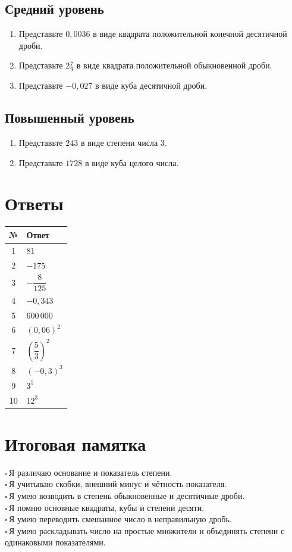 \documentclass[a4paper,12pt]{article}
\newcommand{\cb}{\(\square\)\,}
\begin{document}
\subsection*{Средний уровень}
\begin{enumerate}[leftmargin=*,start=6,itemsep=9pt]
\item Представьте $0,0036$ в виде квадрата положительной конечной десятичной дроби.
\item Представьте $\displaystyle 2\frac79$ в виде квадрата положительной обыкновенной дроби.
\item Представьте $-0,027$ в виде куба десятичной дроби.
\end{enumerate}
\subsection*{Повышенный уровень}
\begin{enumerate}[leftmargin=*,start=9,itemsep=9pt]
\item Представьте $243$ в виде степени числа $3$.
\item Представьте $1728$ в виде куба целого числа.
\end{enumerate}
\clearpage
\section*{Ответы}
\begin{center}
\renewcommand{\arraystretch}{1.45}
\begin{tabular}{@{}cl@{}}
\toprule
№ & Ответ\\\midrule
1 & $81$\\
2 & $-175$\\
3 & $-\dfrac8{125}$\\
4 & $-0,343$\\
5 & $600\,000$\\
6 & $(0,06)^2$\\
7 & $\left(\dfrac53\right)^2$\\
8 & $(-0,3)^3$\\
9 & $3^5$\\
10 & $12^3$\\\bottomrule
\end{tabular}
\end{center}
\section*{Итоговая памятка}
\cb Я различаю основание и показатель степени.\\
\cb Я учитываю скобки, внешний минус и чётность показателя.\\
\cb Я умею возводить в степень обыкновенные и десятичные дроби.\\
\cb Я помню основные квадраты, кубы и степени десяти.\\
\cb Я умею переводить смешанное число в неправильную дробь.\\
\cb Я умею раскладывать число на простые множители и объединять степени с одинаковыми показателями.
\end{document}
